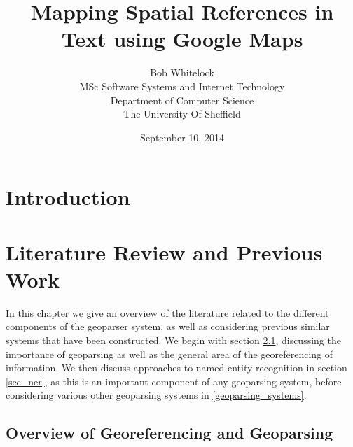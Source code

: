 \documentclass[12pt, a4paper]{report}
\title{Mapping Spatial References in Text using Google Maps}
\date{September 10, 2014}
\author{Bob Whitelock\\ MSc Software Systems and Internet Technology\\ Department of Computer Science\\ The University Of Sheffield}
\begin{document}
\maketitle

\begin{abstract}

\end{abstract}

\tableofcontents

\glsaddall
\printglossaries

\chapter{Introduction}




\chapter{Literature Review and Previous Work}

In this chapter we give an overview of the literature related to the different components of the geoparser system, as well as considering previous similar systems that have been constructed. We begin with section \ref{sec_overview_georeferencing}, discussing the importance of geoparsing as well as the general area of the georeferencing of information. We then discuss approaches to named-entity recognition in section \ref{sec_ner}, as this is an important component of any geoparsing system, before considering various other geoparsing systems in \ref{geoparsing_systems}.


\section{Overview of Georeferencing and Geoparsing}
\label{sec_overview_georeferencing}

\end{document}
